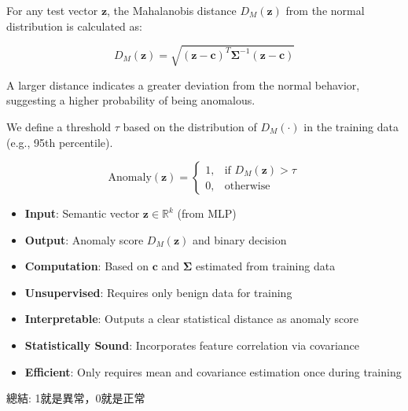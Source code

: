 \begin{ZhChapter}
    For any test vector $\mathbf{z}$, the Mahalanobis distance $D_M(\mathbf{z})$ from the normal distribution is calculated as:

    \begin{equation}
        D_M(\mathbf{z}) = \sqrt{(\mathbf{z} - \boldsymbol{c})^T \boldsymbol{\Sigma}^{-1} (\mathbf{z} - \boldsymbol{c})}
    \end{equation}

    A larger distance indicates a greater deviation from the normal behavior, suggesting a higher probability of being anomalous.



    We define a threshold $\tau$ based on the distribution of $D_M(\cdot)$ in the training data (e.g., 95th percentile).

    \begin{equation}
        \text{Anomaly}(\mathbf{z}) =
        \begin{cases}
            1, & \text{if } D_M(\mathbf{z}) > \tau \\
            0, & \text{otherwise}
        \end{cases}
    \end{equation}



    \begin{itemize}
        \item \textbf{Input}: Semantic vector $\mathbf{z} \in \mathbb{R}^k$ (from MLP)
        \item \textbf{Output}: Anomaly score $D_M(\mathbf{z})$ and binary decision
        \item \textbf{Computation}: Based on $\boldsymbol{c}$ and $\boldsymbol{\Sigma}$ estimated from training data
    \end{itemize}



    \begin{itemize}
        \item \textbf{Unsupervised}: Requires only benign data for training
        \item \textbf{Interpretable}: Outputs a clear statistical distance as anomaly score
        \item \textbf{Statistically Sound}: Incorporates feature correlation via covariance
        \item \textbf{Efficient}: Only requires mean and covariance estimation once during training
    \end{itemize}


    總結: 1就是異常，0就是正常

\end{ZhChapter}